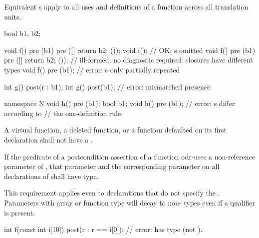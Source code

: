 \begin{note}
Equivalent
s
apply to all uses and definitions
of a function  across all translation units.
\end{note}
\begin{example}
\begin{codeblock}

bool b1, b2;

void f() pre (b1) pre ([]{ return b2; }());
void f();                       // OK, s omitted
void f() pre (b1) pre ([]{ return b2; }()); // ill-formed, no diagnostic required: closures have different types
void f() pre (b1);              // error: s only partially repeated

int g() post(r : b1);
int g() post(b1);       // error: mismatched  presence

namespace N {
  void h() pre (b1);
  bool b1;
  void h() pre (b1);    // error: s differ according to
                        // the one-definition rule.
}
\end{codeblock}
\end{example}

\pnum
A virtual function,
a deleted function,
or a function defaulted on its first declaration
shall not have a .

\pnum
If the predicate of a postcondition assertion
of a function 
odr-uses
a non-reference parameter of ,
that parameter
and the corresponding parameter on all declarations of 
shall have  type.
\begin{note}
This requirement applies
even to declarations that do not specify the .
Parameters with array or function type
will decay to non- types
even if a  qualifier is present.
\begin{example}
\begin{codeblock}
int f(const int i[10])
  post(r : r == i[0]);  // error:  has type  (not ).
\end{codeblock}
\end{example}
\end{note}

